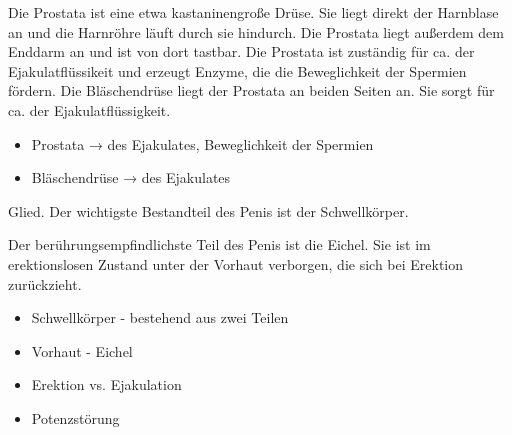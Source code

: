 {%
Die Prostata ist eine etwa kastaninengroße Drüse. Sie liegt
direkt der Harnblase an und die Harnröhre läuft durch sie
hindurch. Die Prostata liegt außerdem dem Enddarm an 
und ist von dort tastbar. 
Die Prostata ist zuständig für ca. \Z{30\PC*} der
Ejakulatflüssikeit und erzeugt Enzyme, die die Beweglichkeit
der Spermien fördern.
Die Bläschendrüse liegt der Prostata an beiden Seiten an.
Sie sorgt für ca. \Z{60\PC*} der Ejakulatflüssigkeit.
}
{
\begin{itemize}
  \item Prostata → \Z{30\PC*} des Ejakulates, Beweglichkeit der Spermien
  \item Bläschendrüse → \Z{60\PC*} des Ejakulates
\end{itemize}
}{}{}{}


{%
 Glied.
Der wichtigste Bestandteil des Penis ist der Schwellkörper.

Der berührungsempfindlichste Teil des Penis ist die Eichel.
Sie ist im erektionslosen Zustand unter der Vorhaut
verborgen, die sich bei Erektion zurückzieht.
}
{
\begin{itemize}
  \item Schwellkörper - bestehend aus zwei Teilen
  \item Vorhaut - Eichel
  \item Erektion vs. Ejakulation
  \item Potenzstörung
\end{itemize}
}{}{}{}



